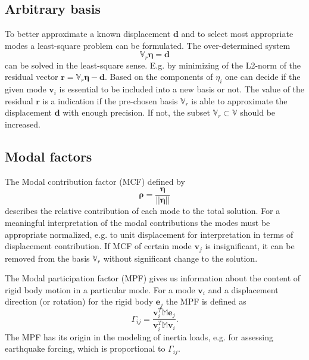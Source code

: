 \documentclass[conference]{journal}
\newcommand{\bb}[1]{\mathbb{#1}}
\newcommand{\B}[1]{\mathbf{#1}}
\newcommand{\Bv}{\B{v}}
\newcommand{\Beta}{\boldsymbol{\eta}}
\newcommand{\Brho}{\boldsymbol{\rho}}
\newcommand{\M}{\bb{M}}
\begin{document}
	\subsection{Arbitrary basis}
	To better approximate a known displacement $\B{d}$ and to select most appropriate modes a least-square problem can be formulated. The over-determined system 
	\begin{equation}
	\bb{V}_r \Beta = \B{d}
	\end{equation}
	can be solved in the least-square sense. E.g. by minimizing of the L2-norm of the residual vector $\B{r} = \bb{V}_r \Beta - \B{d}$. Based on the components of $\eta_i$ one can decide if the given mode $\Bv_i$ is essential to be included into a new basis or not. The value of the residual $\B{r}$ is a indication if the pre-chosen basis $\bb{V}_r$ is able to approximate the displacement $\B{d}$ with enough precision. If not, the subset $\bb{V}_r \subset \bb{V}$ should be increased.
	
	\subsection{Modal factors}
	The Modal contribution factor (MCF) defined by
	\begin{equation} \label{eq:3MCF}
	\Brho = \frac{\Beta}{|| \Beta ||}
	\end{equation}
	describes the relative contribution of each mode to the total solution. For a meaningful interpretation of the modal contributions the modes must be appropriate normalized, e.g. to unit displacement for interpretation in terms of displacement contribution.	If MCF of certain mode $\Bv_j$ is insignificant, it can be removed from the basis $\bb{V}_r$ without significant change to the solution.
	
	The Modal participation factor (MPF) gives us information about the content of rigid body motion in a particular mode. For a mode $\Bv_i$ and a displacement direction (or rotation) for the rigid body $\B{e}_j$ the MPF is defined as
	\begin{equation} \label{eq:3MPF}
	\Gamma_{ij} = \frac{\Bv_i^T \M \B{e}_j}{\Bv_i^T \M \Bv_i}.
	\end{equation}
	The MPF has its origin in the modeling of inertia loads, e.g. for assessing earthquake forcing, which is proportional to $\Gamma_{ij}$.
	
	
\end{document}
